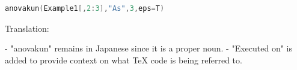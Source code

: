 \begin{lstlisting}[language=c++,label={code:23_08},caption={Executed on anovakun}]
anovakun(Example1[,2:3],"As",3,eps=T)
\end{lstlisting}

Translation: 

- "anovakun" remains in Japanese since it is a proper noun.
- "Executed on" is added to provide context on what TeX code is being referred to.
